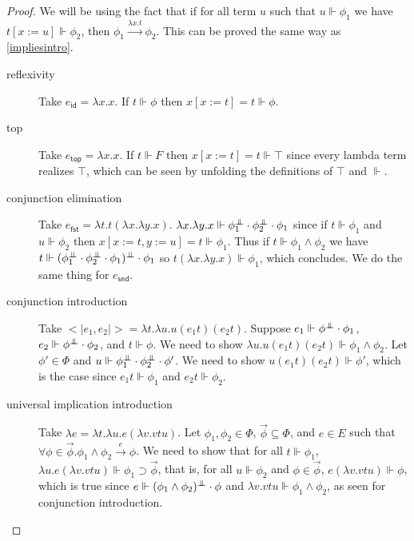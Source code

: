 \documentclass{article}
\newcommand{\pole}{{\bot\mkern-10mu\bot}}
\newcommand{\realizes}{\Vdash}
\newcommand{\eid}{e_\mathsf{id}}
\newcommand{\etop}{e_\mathsf{top}}
\newcommand{\econj}[2]{<|#1, #2|>}
\newcommand{\efst}{e_\mathsf{fst}}
\newcommand{\esnd}{e_\mathsf{snd}}
\begin{document}
\begin{proof}
    We will be using the fact that if for all term $u$ such that $u \realizes \phi_1$ we have $t[x := u] \realizes \phi_2$, then $\phi_1 \xrightarrow{\lambda x. t} \phi_2$.
    This can be proved the same way as \cref{impliesintro}.
    \
    \begin{description}
        \item[reflexivity] Take $\eid = \lambda x. x$. If $t \realizes \phi$ then $x[x := t] = t \realizes \phi$.
        
        \item[top] Take $\etop = \lambda x. x$. If $t \realizes F$ then $x[x := t] = t \realizes \top$ since every lambda term realizes $\top$, which can be seen by unfolding the definitions of $\top$ and $\realizes$.
        
        \item[conjunction elimination] Take $\efst = \lambda t. t (\lambda x. \lambda y. x)$.
        $\lambda x. \lambda y. x \realizes \phi_1^\pole \cdot \phi_2^\pole \cdot \phi_1$ since if $t \realizes \phi_1$ and $u \realizes \phi_2$ then $x[x := t, y := u] = t \realizes \phi_1$.
        Thus if $t \realizes \phi_1 \wedge \phi_2$ we have $t \realizes (\phi_1^\pole \cdot \phi_2^\pole \cdot \phi_1)^\pole \cdot \phi_1$ so $t (\lambda x. \lambda y. x) \realizes \phi_1$, which concludes.
        We do the same thing for $\esnd$.
        
        \item[conjunction introduction] Take $\econj{e_1}{e_2} = \lambda t. \lambda u. u (e_1 t) (e_2 t)$.
        Suppose $e_1 \realizes \phi^\pole \cdot \phi_1$, $e_2 \realizes \phi^\pole \cdot \phi_2$, and $t \realizes \phi$.
        We need to show $\lambda u. u (e_1 t) (e_2 t) \realizes \phi_1 \wedge \phi_2$.
        Let $\phi' \in \Phi$ and $u \realizes \phi_1^\pole \cdot \phi_2^\pole \cdot \phi'$.
        We need to show $u (e_1 t) (e_2 t) \realizes \phi'$, which is the case since $e_1 t \realizes \phi_1$ and $e_2 t \realizes \phi_2$.
        
        \item[universal implication introduction] Take $\lambda{e} = \lambda t. \lambda u. e (\lambda v. v t u)$.
        Let $\phi_1, \phi_2 \in \Phi$, $\vec\phi \subseteq \Phi$, and $e \in E$ such that $\forall \phi \in \vec\phi. \phi_1 \wedge \phi_2 \xrightarrow{e} \phi$.
        We need to show that for all $t \realizes \phi_1$, $\lambda u. e (\lambda v. v t u) \realizes \phi_1 \supset \vec\phi$, that is, for all $u \realizes \phi_2$ and $\phi \in \vec\phi$, $e (\lambda v. v t u) \realizes \phi$, which is true since $e \realizes (\phi_1 \wedge \phi_2)^\pole \cdot \phi$ and $\lambda v. v t u \realizes \phi_1 \wedge \phi_2$, as seen for conjunction introduction.
        

\end{description}
\end{proof}
\end{document}
